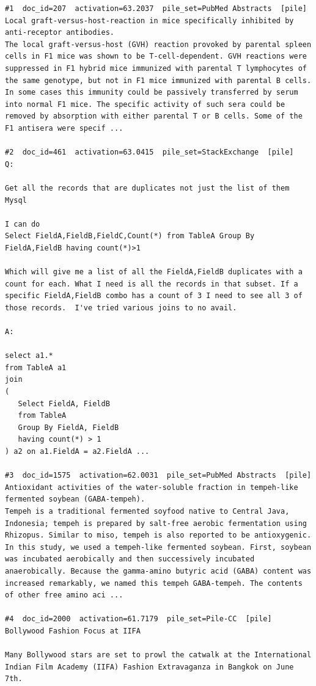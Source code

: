 \begin{verbatim}
#1  doc_id=207  activation=63.2037  pile_set=PubMed Abstracts  [pile]
Local graft-versus-host-reaction in mice specifically inhibited by anti-receptor antibodies.
The local graft-versus-host (GVH) reaction provoked by parental spleen cells in F1 mice was shown to be T-cell-dependent. GVH reactions were suppressed in F1 hybrid mice immunized with parental T lymphocytes of the same genotype, but not in F1 mice immunized with parental B cells. In some cases this immunity could be passively transferred by serum into normal F1 mice. The specific activity of such sera could be removed by absorption with either parental T or B cells. Some of the F1 antisera were specif ...

#2  doc_id=461  activation=63.0415  pile_set=StackExchange  [pile]
Q:

Get all the records that are duplicates not just the list of them Mysql

I can do
Select FieldA,FieldB,FieldC,Count(*) from TableA Group By FieldA,FieldB having count(*)>1

Which will give me a list of all the FieldA,FieldB duplicates with a count for each. What I need is all the records in that subset. If a specific FieldA,FieldB combo has a count of 3 I need to see all 3 of those records.  I've tried various joins to no avail.

A:

select a1.* 
from TableA a1
join
(
   Select FieldA, FieldB
   from TableA 
   Group By FieldA, FieldB 
   having count(*) > 1
) a2 on a1.FieldA = a2.FieldA ...

#3  doc_id=1575  activation=62.0031  pile_set=PubMed Abstracts  [pile]
Antioxidant activities of the water-soluble fraction in tempeh-like fermented soybean (GABA-tempeh).
Tempeh is a traditional fermented soyfood native to Central Java, Indonesia; tempeh is prepared by salt-free aerobic fermentation using Rhizopus. Similar to miso, tempeh is also reported to be antioxygenic. In this study, we used a tempeh-like fermented soybean. First, soybean was incubated aerobically and then successively incubated anaerobically. Because the gamma-amino butyric acid (GABA) content was increased remarkably, we named this tempeh GABA-tempeh. The contents of other free amino aci ...

#4  doc_id=2000  activation=61.7179  pile_set=Pile-CC  [pile]
Bollywood Fashion Focus at IIFA

Many Bollywood stars are set to prowl the catwalk at the International Indian Film Academy (IIFA) Fashion Extravaganza in Bangkok on June 7th.


\end{verbatim}
